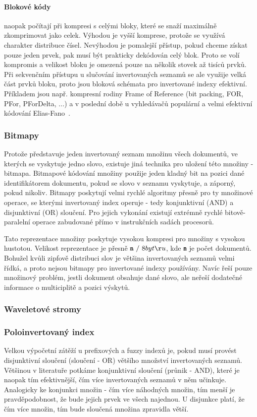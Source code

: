 \documentclass[11pt,letterpaper,oneside,openright]{book}
\newcommand{\bftt}[1]{\texttt{\textbf{#1}}}
\begin{document}
\paragraph{Blokové kódy} naopak počítají při kompresi s celými bloky, které se
snaží maximálně zkomprimovat jako celek. Výhodou je vyšší komprese, protože se
využívá charakter distribuce čísel. Nevýhodou je pomalejší přístup, pokud
chceme získat pouze jeden prvek, pak musí být prakticky dekódován celý blok.
Proto se volí kompromis a velikost bloku je omezená pouze na několik stovek až
tisíců prvků. Při sekvenčním přístupu u slučování invertovaných seznamů se ale
využije velká část prvků bloku, proto jsou bloková schémata pro invertované
indexy efektivní. Příkladem jsou např. kompresní rodiny Frame of Reference (bit
packing, FOR, PFor, PForDelta, ...) a v poslední době u vyhledávačů populární a
velmi efektivní kódování Elias-Fano~\cite{DBLP:journals/corr/abs-1206-4300}.

\subsubsection{Bitmapy}
Protože představuje jeden invertovaný seznam množinu všech dokumentů, ve
kterých se vyskytuje jedno slovo, existuje jiná technika pro uložení této
množiny - bitmapa. Bitmapové kódování množiny použije jeden kladný bit na
pozici dané identifikátorem dokumentu, pokud se slovo v seznamu vyskytuje, a
záporný, pokud nikoliv. Bitmapy poskytují velmi rychlé algoritmy přesně pro ty
množinové operace, se kterými invertovaný index operuje - tedy konjunktivní
(AND) a disjunktivní (OR) sloučení. Pro jejich vykonání existují extrémně
rychlé bitově-paralelní operace zabudované přímo v instrukčních sadách
procesorů.

Tato reprezentace množiny poskytuje vysokou kompresi pro množiny s vysokou
hustotou. Velikost reprezentace je přesně $\bftt{n}\ /\ 8 bytů$, kde \bftt{n}
je počet dokumentů. Bohužel kvůli zipfově distribuci slov je většina
invertovaných seznamů velmi řídká, a proto nejsou bitmapy pro invertované
indexy používány. Navíc řeší pouze množinový problém, jestli dokument obsahuje
dané slovo, ale neřeší dodatečné informace o multiciplitě a pozici výskytů.

\subsubsection{Waveletové stromy}

\subsubsection{Poloinvertovaný index}
Velkou výpočetní zátěží u prefixových a fuzzy indexů je, pokud musí provést
disjunktivní sloučení (sloučení - OR) většího množství invertovaných seznamů.
Většinou v literatuře potkáme konjunktivní sloučení (průnik - AND), které je
naopak tím efektivnější, čím více invertovaných seznamů v něm učinkuje.
Analogicky ke konjunkci množin - čím více náhodných množin, tím menší je
pravděpodobnost, že bude jejich prvek ve všech najednou. U disjunkce platí, že
čím více množin, tím bude sloučená množina zpravidla větší.
\end{document}
